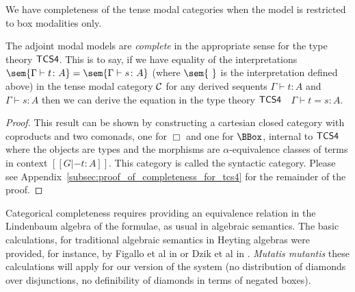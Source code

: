 We  have completeness of the tense modal categories when the model is restricted to box modalities only.

\begin{theorem}
\label{thm:tcs4-completeness}
The adjoint modal models are \textit{complete} in the appropriate
sense for the type theory $\sf{TCS4}$. This is to say, if we have
equality of the interpretations $\sem{\Gamma \vdash t \colon A} =
\sem{\Gamma \vdash s \colon A}$ (where \mbox{$\sem{\ } $} is the
interpretation defined above) in the tense modal category $\cal C$ for
any derived sequents $\Gamma \vdash t \colon A$ and $\Gamma \vdash s
\colon A$ then we can derive the equation in the type theory
$\sf{TCS4}$ $\;$ $\Gamma \vdash t = s \colon A$.
\end{theorem}
\begin{proof}
  This result can be shown by constructing a cartesian closed category
  with coproducts and two comonads, one for $\Box$ and one for
  $\BBox$, internal to $\sf{TCS4}$ where the objects are types and the
  morphisms are $\alpha$-equivalence classes of terms in context $[[G
      |- t : A]]$.  This category is called the syntactic
  category. Please see
  Appendix~\ref{subsec:proof_of_completeness_for_tcs4} for the
  remainder of the proof.
\end{proof}
Categorical completeness requires providing an equivalence relation in
the Lindenbaum algebra of the formulae, as usual in algebraic
semantics. The basic calculations, for traditional algebraic semantics
in Heyting algebras were provided, for instance, by Figallo et al in
\cite{figallo2014} or Dzik et al in \cite{dzik2010}. \textit{Mutatis mutantis} these calculations will
apply for our version of the system (no distribution of diamonds over
disjunctions, no definibility of diamonds in terms of negated boxes).

